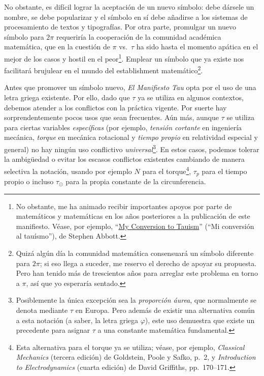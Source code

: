 No obstante, es difícil lograr la aceptación de un nuevo símbolo: debe dársele un nombre, se debe popularizar y el símbolo en sí debe añadirse a los sistemas de procesamiento de textos y tipografías. Por otra parte, promulgar un nuevo símbolo para $2\pi$ requeriría la cooperación de la comunidad académica matemática, que en la cuestión de $\pi$ vs.\ $\tau$ ha sido hasta el momento apática en el mejor de los casos y hostil en el peor\footnote{

No obstante, me ha animado recibir importantes apoyos por parte de matemáticos y matemáticas en los años posteriores a la publicación de este manifiesto. Véase, por ejemplo, ``\href{https://www.maa.org/sites/default/files/pdf/Mathhorizons/apr12_aftermath.pdf}{My Conversion to Tauism}'' (``Mi conversión al tauísmo''), de Stephen Abbott.}. Emplear un símbolo que ya existe nos facilitará brujulear en el mundo del establishment matemático\footnote{Quizá algún día la comunidad matemática consensuará un símbolo diferente para $2\pi$; si eso llega a suceder, me reservo el derecho de apoyar su propuesta. Pero han tenido más de trescientos años para arreglar este problema en torno a $\pi$, así que yo esperaría sentado.}.

Antes que promover un símbolo nuevo, \emph{El Manifiesto Tau} opta por el uso de una letra griega existente. Por ello, dado que $\tau$ ya se utiliza en algunos contextos, debemos atender a los conflictos con la práctica vigente. Por suerte hay sorprendentemente pocos usos que sean frecuentes. Aún más, aunque $\tau$ se utiliza para ciertas variables \emph{específicas} (por ejemplo, \emph{tensión cortante} en ingeniería mecánica, \emph{torque} en mecánica rotacional y  \emph{tiempo propio} en relatividad especial y general) no hay ningún uso conflictivo \emph{universal}\footnote{Posiblemente la única excepción sea la \emph{proporción áurea}, que normalmente se denota mediante $\tau$ en Europa. Pero además de existir una alternativa común a esta notación (a saber, la letra griega $\varphi$), este uso demuestra que existe un precedente para asignar $\tau$ a una constante matemática fundamental.}. En estos casos, podemos tolerar la ambigüedad o evitar los escasos conflictos existentes cambiando de manera selectiva la notación, usando por ejemplo $N$ para el torque\footnote{Esta alternativa para el torque ya se utiliza; véase, por ejemplo, \emph{Classical Mechanics} (tercera edición) de Goldstein, Poole y Safko, p.~2, y \emph{Introduction to Electrodynamics} (cuarta edición) de David Griffiths, pp.~170–171.}, $\tau_p$ para el tiempo propio o incluso $\tau_\odot$ para la propia constante de la circunferencia.

